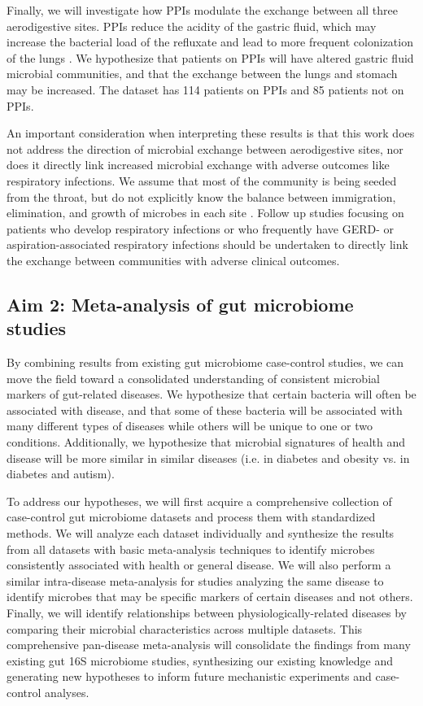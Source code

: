 \documentclass[12pt]{article}
\begin{document}
Finally, we will investigate how PPIs modulate the exchange between
all three aerodigestive sites. PPIs reduce the acidity of the gastric
fluid, which may increase the bacterial load of the refluxate and
lead to more frequent colonization of the lungs \cite{rosen-bal_culture-2011}.
We hypothesize that patients on PPIs will have altered gastric fluid
microbial communities, and that the exchange between the lungs and
stomach may be increased. The dataset has 114 patients on PPIs and 85 patients not on PPIs.

An important consideration when interpreting these results is that
this work does not address the direction of microbial exchange between 
aerodigestive sites, nor does it directly link increased microbial 
exchange with adverse outcomes like respiratory infections.
We assume that most of the community is being seeded from the throat, 
but do not explicitly know the balance between immigration, elimination, and 
growth of microbes in each site \cite{bassis-source-2015}.
Follow up studies focusing on patients who develop respiratory 
infections or who frequently have GERD- or aspiration-associated 
respiratory infections should be undertaken to directly link the exchange
between communities with adverse clinical outcomes. 

\subsection{Aim 2: Meta-analysis of gut microbiome studies}\label{sec:aim2}
By combining results from existing gut microbiome case-control 
studies, we can move the field toward a consolidated understanding of 
consistent microbial markers of gut-related diseases. We hypothesize 
that certain bacteria will often be associated with disease, and that 
some of these bacteria will be associated with many different types of 
diseases while others will be unique to one or two conditions. 
Additionally, we hypothesize that microbial signatures  of health and 
disease will be more similar in similar diseases (i.e. in diabetes and 
obesity vs. in diabetes and autism).

To address our hypotheses, we will first acquire a comprehensive
collection of case-control gut microbiome datasets and process them
with standardized methods. We will analyze each dataset individually
and synthesize the results from all datasets with basic meta-analysis 
techniques to identify microbes consistently associated with health or 
general disease. We will also perform a similar intra-disease meta-analysis 
for studies analyzing the same disease to identify microbes
that may be specific markers of certain diseases and not others.
Finally, we will identify relationships between physiologically-related 
diseases by comparing their microbial characteristics across multiple
datasets. This comprehensive pan-disease meta-analysis will
consolidate the findings from many existing gut 16S microbiome studies,
synthesizing our existing knowledge and generating new hypotheses to
inform future mechanistic experiments and case-control analyses.
\end{document}
